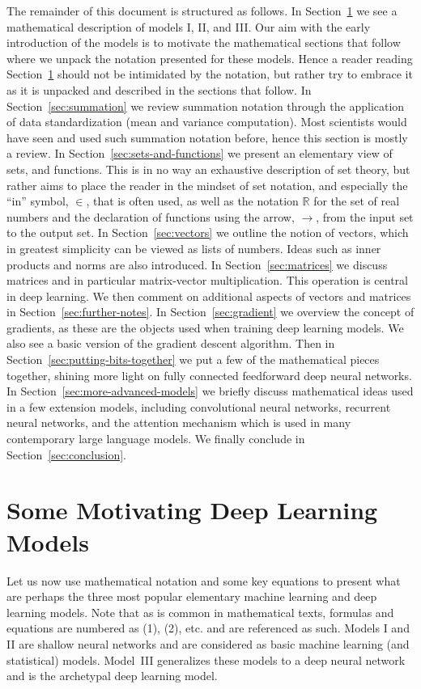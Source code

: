 \documentclass[12pt]{article}
\begin{document}
The remainder of this document is structured as follows. In Section~\ref{sec:motivating-deep-learning-models} we see a mathematical description of models I, II, and III. Our aim with the early introduction of the models is to motivate the mathematical sections that follow where we unpack the notation presented for these models. Hence a reader reading Section~\ref{sec:motivating-deep-learning-models} should not be intimidated by the notation, but rather try to embrace it as it is unpacked and described in the sections that follow. In Section~\ref{sec:summation} we review summation notation through the application of data standardization (mean and variance computation). Most scientists would have seen and used such summation notation before, hence this section is mostly a review.  In Section~\ref{sec:sets-and-functions} we present an elementary view of sets, and functions. This is in no way an exhaustive description of set theory, but rather aims to place the reader in the mindset of set notation, and especially the ``in'' symbol, $\in$, that is often used, as well as the notation ${\mathbb R}$ for the set of real numbers and the declaration of functions using the arrow, $\to$, from the input set to the output set. In Section~\ref{sec:vectors} we outline the notion of vectors, which in greatest simplicity can be viewed as lists of numbers. Ideas such as inner products and norms are also introduced. In Section~\ref{sec:matrices} we discuss matrices and in particular matrix-vector multiplication. This operation is central in deep learning. We then comment on additional aspects of vectors and matrices in Section~\ref{sec:further-notes}. In Section~\ref{sec:gradient} we overview the concept of gradients, as these are the objects used when training deep learning models. We also see a basic version of the gradient descent algorithm. Then in Section~\ref{sec:putting-bits-together} we put a few of the mathematical pieces together, shining more light on fully connected feedforward deep neural networks. In Section~\ref{sec:more-advanced-models} we briefly discuss mathematical ideas used in a few extension models, including convolutional neural networks, recurrent neural networks, and the attention mechanism which is used in many contemporary large language models. We finally conclude in Section~\ref{sec:conclusion}.

\section{Some Motivating Deep Learning Models}
\label{sec:motivating-deep-learning-models}
Let us now use mathematical notation and some key equations to present what are perhaps the three most popular elementary machine learning and deep learning models. Note that as is common in mathematical texts, formulas and equations are numbered as (1), (2), etc. and are referenced as such. Models I and II are shallow neural networks and are considered as basic machine learning (and statistical) models. Model~III generalizes these models to a deep neural network and is the archetypal deep learning model.
\end{document}
